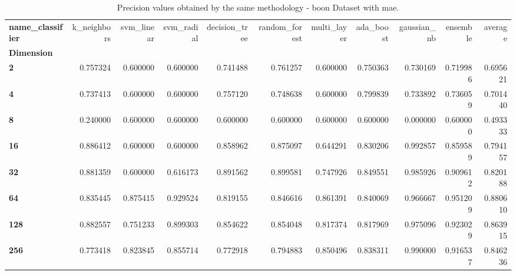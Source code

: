 \begin{table}
\centering
\caption{Precision values obtained by the same methodology - boon Dataset with mae.}
\label{precision_boon_mae-reproduction}
\begin{tabular}{lrrrrrrrrrr}
\toprule
\textbf{name\_classifier} &  k\_neighbors &  svm\_linear &  svm\_radial &  decision\_tree &  random\_forest &  multi\_layer &  ada\_boost &  gaussian\_nb &  ensemble &   average \\
\textbf{Dimension} &              &             &             &                &                &              &            &              &           &           \\
\midrule
\textbf{2        } &     0.757324 &    0.600000 &    0.600000 &       0.741488 &       0.761257 &     0.600000 &   0.750363 &     0.730169 &  0.719986 &  0.695621 \\
\textbf{4        } &     0.737413 &    0.600000 &    0.600000 &       0.757120 &       0.748638 &     0.600000 &   0.799839 &     0.733892 &  0.736059 &  0.701440 \\
\textbf{8        } &     0.240000 &    0.600000 &    0.600000 &       0.600000 &       0.600000 &     0.600000 &   0.600000 &     0.000000 &  0.600000 &  0.493333 \\
\textbf{16       } &     0.886412 &    0.600000 &    0.600000 &       0.858962 &       0.875097 &     0.644291 &   0.830206 &     0.992857 &  0.859589 &  0.794157 \\
\textbf{32       } &     0.881359 &    0.600000 &    0.616173 &       0.891562 &       0.899581 &     0.747926 &   0.849551 &     0.985926 &  0.909612 &  0.820188 \\
\textbf{64       } &     0.835445 &    0.875415 &    0.929524 &       0.819155 &       0.846616 &     0.861391 &   0.840069 &     0.966667 &  0.951209 &  0.880610 \\
\textbf{128      } &     0.882557 &    0.751233 &    0.899303 &       0.854622 &       0.854048 &     0.817374 &   0.817969 &     0.975096 &  0.923029 &  0.863915 \\
\textbf{256      } &     0.773418 &    0.823845 &    0.855714 &       0.772918 &       0.794883 &     0.850496 &   0.838311 &     0.990000 &  0.916537 &  0.846236 \\
\bottomrule
\end{tabular}
\end{table}
